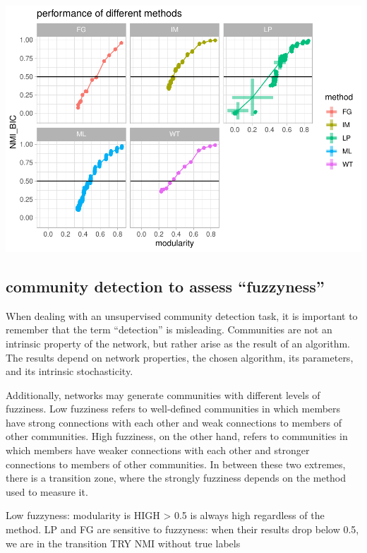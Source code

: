 \documentclass[
]{article}
\begin{document}
\includegraphics{com_det_algorithms_files/figure-latex/unnamed-chunk-16-1.pdf}

\newpage

\hypertarget{community-detection-to-assess-fuzzyness}{%
\subsection{community detection to assess
``fuzzyness''}\label{community-detection-to-assess-fuzzyness}}

When dealing with an unsupervised community detection task, it is
important to remember that the term ``detection'' is misleading.
Communities are not an intrinsic property of the network, but rather
arise as the result of an algorithm. The results depend on network
properties, the chosen algorithm, its parameters, and its intrinsic
stochasticity.

Additionally, networks may generate communities with different levels of
fuzziness. Low fuzziness refers to well-defined communities in which
members have strong connections with each other and weak connections to
members of other communities. High fuzziness, on the other hand, refers
to communities in which members have weaker connections with each other
and stronger connections to members of other communities. In between
these two extremes, there is a transition zone, where the strongly
fuzziness depends on the method used to measure it.

Low fuzzyness: modularity is HIGH \textgreater{} 0.5 is always high
regardless of the method. LP and FG are sensitive to fuzzyness: when
their results drop below 0.5, we are in the transition TRY NMI without
true labels
\end{document}
